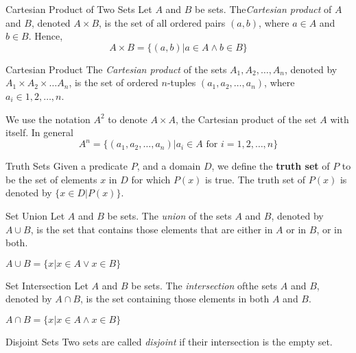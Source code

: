 \documentclass [handout]{beamer}
\begin{document}
 \begin{frame}{Cartesian Product of Two Sets}
 Let $A$ and $B$ be sets. The\textit{Cartesian product} of $A$ and $B$, denoted $A \times B$, is the set of all ordered pairs $(a,b)$, where $a\in A$ and $b \in B$. Hence, 
 \begin{displaymath}
 A \times B = \{(a,b) | a\in A \land b\in B\}
 \end{displaymath}
 \end{frame}
 
 \begin{frame}{Cartesian Product}
 The \textit{Cartesian product} of the sets $A_1,A_2, \ldots ,A_n$, denoted by $A_1 \times A_2 \times \ldots A_n$, is the set of ordered $n$-tuples $(a_1,a_2,\ldots,a_n)$, where $a_i\in 1,2,\ldots,n$.
 
 We use the notation $A^2$ to denote $A\times A$, the Cartesian product of the set $A$ with itself. In general
 \begin{displaymath}
 A^n=\{(a_1,a_2,\ldots,a_n) | a_i\in A \text{ for } i=1,2, \ldots ,n\}
 \end{displaymath}
 \end{frame}
 
 \begin{frame}{Truth Sets}
  Given a predicate $P$, and a domain $D$, we define the \textbf{truth set} of $P$ to be the set of elements $x$ in $D$ for which $P(x)$ is true. The truth set of $P(x)$ is denoted by $\{x\in D | P(x)\}$.
 \end{frame}
 
 \begin{frame}{Set Union}
 Let $A$ and $B$ be sets. The \textit{union} of the sets $A$ and $B$, denoted by $A \cup B$, is the set that contains those elements that are either in $A$ or in $B$, or in both.

$A \cup B = \{x |x\in A \lor x \in B\}$
 \end{frame}
 
 \begin{frame}{Set Intersection}
 Let $A$ and $B$ be sets. The \textit{intersection} ofthe sets $A$ and $B$, denoted by $A\cap B$, is the set containing those elements in both $A$ and $B$.
 
 $A\cap B=\{x|x\in A \land x\in B\}$
 \end{frame}
 
 \begin{frame}{Disjoint Sets}
 Two sets are called \textit{disjoint} if their intersection is the empty set.
 \end{frame}
 
\end{document}
